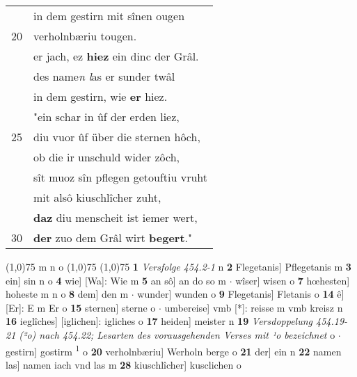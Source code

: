 \documentclass[8pt,a4paper,notitlepage]{article}
\begin{document}
\begin{table}[ht]
\begin{minipage}[t]{0.5\linewidth}
\begin{tabular}{rl}
 & in dem gestirn mit sînen ougen\\ 
20 & verholnbæriu tougen.\\ 
 & er jach, ez \textbf{hiez} ein dinc der Grâl.\\ 
 & des name\textit{n l}as er sunder twâl\\ 
 & in dem gestirn, wie \textbf{er} hiez.\\ 
 & "ein schar in ûf der erden liez,\\ 
25 & diu vuor ûf über die sternen hôch,\\ 
 & ob die ir unschuld wider zôch,\\ 
 & sît muoz sîn pflegen getouftiu vruht\\ 
 & mit alsô kiuschlîcher zuht,\\ 
 & \textbf{daz} diu menscheit ist iemer wert,\\ 
30 & \textbf{der} zuo dem Grâl wirt \textbf{begert}."\\ 
\end{tabular}
\scriptsize
\line(1,0){75} \newline
m n o \newline
\line(1,0){75} \newline
\newline
\line(1,0){75} \newline
\textbf{1} \textit{Versfolge 454.2-1} n  \textbf{2} Flegetanis] Pflegetanis m \textbf{3} ein] sin n o \textbf{4} wie] [Wa]: Wie m \textbf{5} an sô] an do so m  $\cdot$ wîser] wisen o \textbf{7} hœhesten] hoheste m n o \textbf{8} dem] den m  $\cdot$ wunder] wunden o \textbf{9} Flegetanis] Fletanis o \textbf{14} ê] [Er]: E m Er o \textbf{15} sternen] sterne o  $\cdot$ umbereise] vmb [*]: reisse m vmb kreisz n \textbf{16} ieglîches] [iglichen]: igliches o \textbf{17} heiden] meister n \textbf{19} \textit{Versdoppelung 454.19-21 (²o) nach 454.22; Lesarten des vorausgehenden Verses mit ¹o bezeichnet} o   $\cdot$ gestirn] gostirm \textsuperscript{1}\hspace{-1.3mm} o \textbf{20} verholnbæriu] Werholn berge o \textbf{21} der] ein n \textbf{22} namen las] namen iach vnd las m \textbf{28} kiuschlîcher] kusclichen o \newline
\end{minipage}
\end{table}
\newpage
\end{document}
